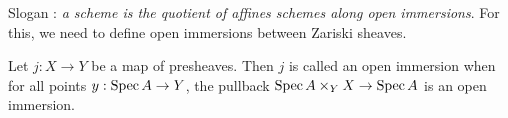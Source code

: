 \documentclass[./main.tex]{subfiles}
\begin{document}
Slogan : 
\emph{a scheme is the quotient of affines schemes 
along open immersions}.
For this, we need to define open immersions between Zariski sheaves.




\begin{dfn}
  
  Let $j : X \to Y$ be a map of presheaves.
  Then $j$ is called an open immersion when
  for all points $y : \operatorname{Spec} A \to Y$,
  the pullback $\operatorname{Spec} A \times_Y X \to \operatorname{Spec} A$
  is an open immersion.
\end{dfn}
\end{document}
